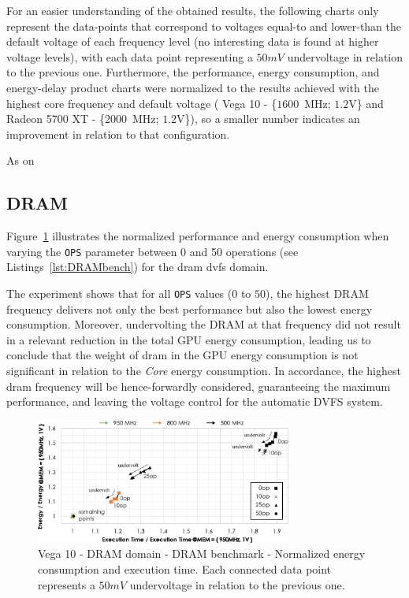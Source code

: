 For an easier understanding of the obtained results, the following charts only represent the data-points that correspond to voltages equal-to and lower-than the default voltage of each frequency level (no interesting data is found at higher voltage levels), with each data point representing a $50mV$ undervoltage in relation to the previous one.
Furthermore, the performance, energy consumption, and energy-delay product charts were normalized to the results achieved with the highest core frequency and default voltage ( Vega 10 - \{$1600$~MHz; $1.2$V\} and Radeon 5700 XT - \{$2000$~MHz; $1.2$V\}), so a smaller number indicates an improvement in relation to that configuration. 

As on

\subsection{DRAM}

Figure~\ref{fig:DRAM_behaviour} illustrates the normalized performance and energy consumption when varying the \texttt{OPS} parameter between 0 and 50 operations (see Listings~\ref{lst:DRAMbench}) for the \acrshort{dram} \acrshort{dvfs} domain.

The experiment shows that for all \texttt{OPS} values ($0$ to $50$), the highest DRAM frequency delivers not only the best performance but also the lowest energy consumption. Moreover, undervolting the DRAM at that frequency did not result in a relevant reduction in the total GPU energy consumption, leading us to conclude that the weight of \acrshort{dram} in the GPU energy consumption is not significant in relation to the \textit{Core} energy consumption. In accordance, the highest \acrshort{dram} frequency will be hence-forwardly considered, guaranteeing the maximum performance, and leaving the voltage control for the automatic DVFS system.


\begin{figure}[htb]
  \centering
  \includegraphics[width=0.75\textwidth]{Figures/GPU_characterization/DRAM_behaviour.pdf}
  \caption{Vega 10 - DRAM domain - DRAM benchmark - Normalized energy consumption and execution time. Each connected data point represents a $50mV$ undervoltage in relation to the previous one.}
  \label{fig:DRAM_behaviour}
\end{figure}

